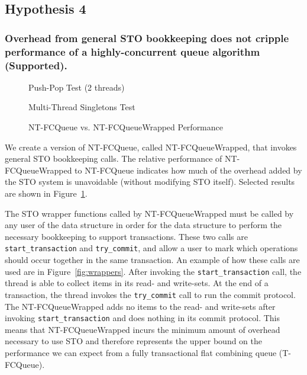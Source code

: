 \subsection{Hypothesis 4}
\subsubsection{Overhead from general STO bookkeeping does not cripple performance of a highly-concurrent queue algorithm (Supported).}

\begin{figure}[ht!]
    \centering
	\begin{minipage}{0.75\textwidth}
        \caption*{Push-Pop Test (2 threads)}
        \vspace{12pt}
	\end{minipage}
   	\begin{minipage}{0.75\textwidth}
        \caption*{Multi-Thread Singletons Test}
	\end{minipage}
        \caption{NT-FCQueue vs. NT-FCQueueWrapped Performance}
    \label{fig:wrappedqs}
\end{figure}

We create a version of NT-FCQueue, called NT-FCQueueWrapped, that invokes general STO bookkeeping calls. The relative performance of NT-FCQueueWrapped to NT-FCQueue indicates how much of the overhead added by the STO system is unavoidable (without modifying STO itself). 
Selected results are shown in Figure~\ref{fig:wrappedqs}.

The STO wrapper functions called by NT-FCQueueWrapped must be called by any user of the data structure in order for the data structure to perform the necessary bookkeeping to support transactions.
These two calls are \texttt{start\_transaction} and \texttt{try\_commit}, and allow a user to mark which operations should occur together in the same transaction. An example of how these calls are used are in Figure~\ref{fig:wrappers}. After invoking the \texttt{start\_transaction} call, the thread is able to collect items in its read- and write-sets. At the end of a transaction, the thread invokes the \texttt{try\_commit} call to run the commit protocol. The NT-FCQueueWrapped adds no items to the read- and write-sets after invoking \texttt{start\_transaction} and does nothing in its commit protocol. This means that NT-FCQueueWrapped incurs the minimum amount of overhead necessary to use STO and therefore represents the upper bound on the performance we can expect from a fully transactional flat combining queue (T-FCQueue). 

